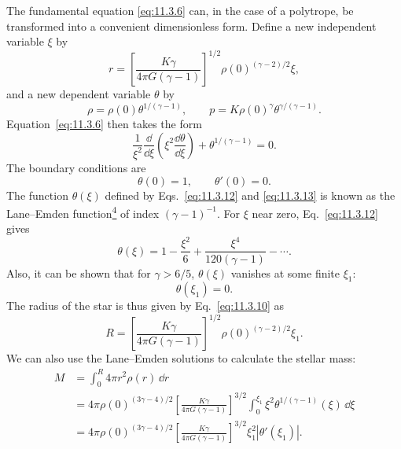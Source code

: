 The fundamental equation \eqref{eq:11.3.6} can, in the case of a polytrope,
be transformed into a convenient dimensionless form. Define a new independent
variable \(\xi\) by
\begin{equation}
  r
  =
  \left[\frac{K\gamma}{4\pi G(\gamma-1)}\right]^{1/2}
  \rho(0)^{(\gamma-2)/2}\xi,
  \tag{11.3.10}\label{eq:11.3.10}
\end{equation}
and a new dependent variable \(\theta\) by
\begin{equation}
  \rho=\rho(0)\theta^{1/(\gamma-1)},
  \qquad
  p=K\rho(0)^\gamma\theta^{\gamma/(\gamma-1)}.
  \tag{11.3.11}\label{eq:11.3.11}
\end{equation}
Equation~\eqref{eq:11.3.6} then takes the form
\begin{equation}
  \frac1{\xi^2}\frac{\dd}{\dd\xi}
  \left(\xi^2\frac{\dd\theta}{\dd\xi}\right)
  +\theta^{1/(\gamma-1)}=0.
  \tag{11.3.12}\label{eq:11.3.12}
\end{equation}
The boundary conditions are
\begin{equation}
  \theta(0)=1,\qquad\theta'(0)=0.
  \tag{11.3.13}\label{eq:11.3.13}
\end{equation}
The function \(\theta(\xi)\) defined by
Eqs.~\eqref{eq:11.3.12} and \eqref{eq:11.3.13} is known as the
Lane--Emden function\hyperref[ch11-ref-4]{\textsuperscript{4}} of index
\((\gamma-1)^{-1}\). For \(\xi\) near zero, Eq.~\eqref{eq:11.3.12} gives
\begin{equation}
  \theta(\xi)
  =
  1-\frac{\xi^2}{6}
  +\frac{\xi^4}{120(\gamma-1)}
  -\cdots.
  \tag{11.3.14}\label{eq:11.3.14}
\end{equation}
Also, it can be shown that for \(\gamma>6/5\), \(\theta(\xi)\) vanishes at
some finite \(\xi_1\):
\begin{equation}
  \theta(\xi_1)=0.
  \tag{11.3.15}\label{eq:11.3.15}
\end{equation}
The radius of the star is thus given by Eq.~\eqref{eq:11.3.10} as
\begin{equation}
  R
  =
  \left[\frac{K\gamma}{4\pi G(\gamma-1)}\right]^{1/2}
  \rho(0)^{(\gamma-2)/2}\xi_1.
  \tag{11.3.16}\label{eq:11.3.16}
\end{equation}
We can also use the Lane--Emden solutions to calculate the stellar mass:
\begin{equation}
  \begin{aligned}
  M
  &=
  \int_0^R4\pi r^2\rho(r)\,\dd r\\
  &=
  4\pi\rho(0)^{(3\gamma-4)/2}
  \left[\frac{K\gamma}{4\pi G(\gamma-1)}\right]^{3/2}
  \int_0^{\xi_1}\xi^2\theta^{1/(\gamma-1)}(\xi)\,\dd\xi\\
  &=
  4\pi\rho(0)^{(3\gamma-4)/2}
  \left[\frac{K\gamma}{4\pi G(\gamma-1)}\right]^{3/2}
  \xi_1^2\left|\theta'(\xi_1)\right|.
  \end{aligned}
  \tag{11.3.17}\label{eq:11.3.17}
\end{equation}
